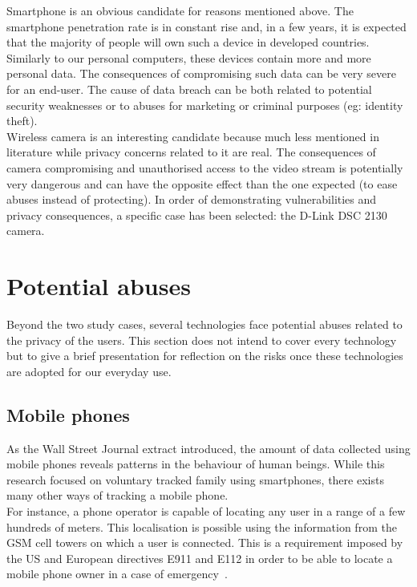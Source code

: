 Smartphone is an obvious candidate for reasons mentioned above.
The smartphone penetration rate is in constant rise and, in a few years, it is expected that the  majority of people will own such a device in developed countries.
Similarly to our personal computers, these devices contain more and more personal data.
The consequences of compromising such data can be very severe for an end-user.
The cause of data breach can be both related to potential security weaknesses or to abuses for marketing or criminal purposes (eg: identity theft).\\

Wireless camera is an interesting candidate because much less mentioned in literature while privacy concerns related to it are real.
The consequences of camera compromising and unauthorised access to the video stream is potentially very dangerous and can have the opposite effect than the one expected (to ease abuses instead of protecting).
In order of demonstrating vulnerabilities and privacy consequences, a specific case has been selected: the D-Link DSC 2130 camera.

\section*{Potential abuses}

Beyond the two study cases, several technologies face potential abuses related to the privacy of the users.
This section does not intend to cover every technology but to give a brief presentation for reflection on the risks once these technologies are adopted for our everyday use.\\

\subsection*{Mobile phones}

As the Wall Street Journal extract introduced, the amount of data collected using mobile phones reveals patterns in the behaviour of human beings.
While this research focused on voluntary tracked family using smartphones, there exists many other ways of tracking a mobile phone.\\

For instance, a phone operator is capable of locating any user in a range of a few hundreds of meters.
This localisation is possible using the information from the GSM cell towers on which a user is connected.
This is a requirement imposed by the US and European directives E911 and E112 in order to be able to locate a mobile phone owner in a case of emergency~\cite{e112-recom}.\\

